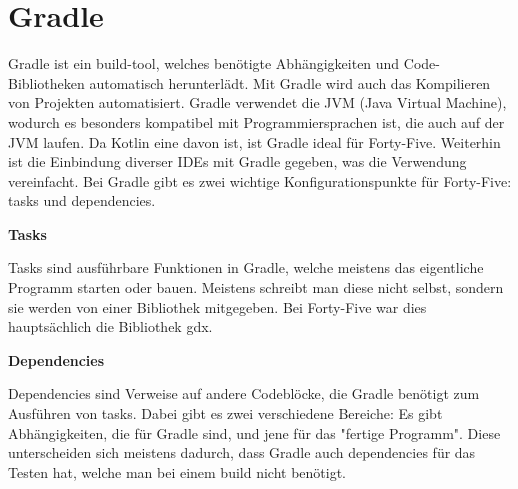 
\renewcommand{\kapitelautor}{Autor: Felix Zwickelstorfer}
\section{Gradle}\label{sec:gradle}

\renewcommand{\kapitelautor}{Autor: Felix Zwickelstorfer}

Gradle ist ein build-tool, welches benötigte Abhängigkeiten und Code-Bibliotheken automatisch herunterlädt.
Mit Gradle wird auch das Kompilieren von Projekten automatisiert.
Gradle verwendet die JVM (Java Virtual Machine), wodurch es besonders kompatibel mit Programmiersprachen ist, die auch auf der JVM laufen.
Da Kotlin eine davon ist, ist Gradle ideal für Forty-Five.
Weiterhin ist die Einbindung diverser IDEs mit Gradle gegeben, was die Verwendung vereinfacht.
Bei Gradle gibt es zwei wichtige Konfigurationspunkte für Forty-Five: tasks und dependencies.

\textbf{Tasks}

Tasks sind ausführbare Funktionen in Gradle, welche meistens das eigentliche Programm starten oder bauen.
Meistens schreibt man diese nicht selbst, sondern sie werden von einer Bibliothek mitgegeben.
Bei Forty-Five war dies hauptsächlich die Bibliothek gdx.

\textbf{Dependencies}

Dependencies sind Verweise auf andere Codeblöcke, die Gradle benötigt zum Ausführen von tasks.
Dabei gibt es zwei verschiedene Bereiche: Es gibt Abhängigkeiten, die für Gradle sind, und jene für das "fertige Programm".
Diese unterscheiden sich meistens dadurch, dass Gradle auch dependencies für das Testen hat, welche man bei einem build nicht benötigt.\cite{gradleHomePage}
